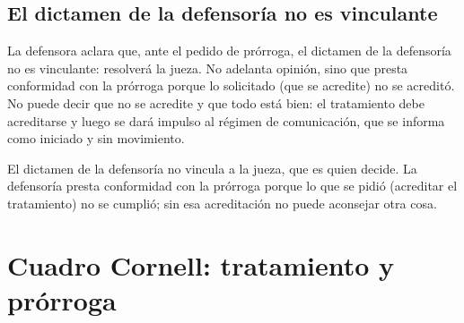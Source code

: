 \documentclass[12pt,oneside]{book}
\begin{document}
\subsection{El dictamen de la defensor\'ia no es vinculante}

La defensora aclara que, ante el pedido de pr\'orroga, el dictamen de la defensor\'ia no es vinculante: resolver\'a la jueza. No adelanta opini\'on, sino que presta conformidad con la pr\'orroga porque lo solicitado (que se acredite) no se acredit\'o. No puede decir que no se acredite y que todo est\'a bien: el tratamiento debe acreditarse y luego se dar\'a impulso al r\'egimen de comunicaci\'on, que se informa como iniciado y sin movimiento.

\begin{important}
El dictamen de la defensor\'ia no vincula a la jueza, que es quien decide. La defensor\'ia presta conformidad con la pr\'orroga porque lo que se pidi\'o (acreditar el tratamiento) no se cumpli\'o; sin esa acreditaci\'on no puede aconsejar otra cosa.
\end{important}

\section{Cuadro Cornell: tratamiento y pr\'orroga}
\end{document}
